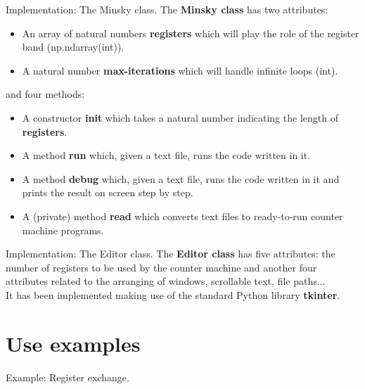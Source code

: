 \documentclass[aspectratio=169]{beamer}
\begin{document}
\begin{frame}{Implementation: The Minsky class.}
The \textbf{Minsky class} has two attributes:
    \begin{itemize}
        \item An array of natural numbers \textbf{registers} which will play the role of the register band (np.ndarray(int)).
        \item A natural number \textbf{max-iterations} which will handle infinite loops (int).
    \end{itemize}
and four methods: 
    \begin{itemize}
        \item A constructor \textbf{init} which takes a natural number indicating the length of \textbf{registers}.
        \item A method \textbf{run} which, given a text file, runs the code written in it.
        \item A method \textbf{debug} which, given a text file, runs the code written in it and prints the result on screen step by step.
        \item A (private) method \textbf{read} which converts text files to ready-to-run counter machine programs. 
    \end{itemize}
\end{frame}

\begin{frame}{Implementation: The Editor class.}
The \textbf{Editor class} has five attributes: the number of registers to be used by the counter machine and another four
attributes related to the arranging of windows, scrollable text, file paths...  \\
It has been implemented making use of the standard Python library \textbf{tkinter}.
\end{frame}

\section{Use examples}

\begin{frame}{Example: Register exchange.}
    \begin{center}
    \end{center}
\end{frame}
\end{document}
